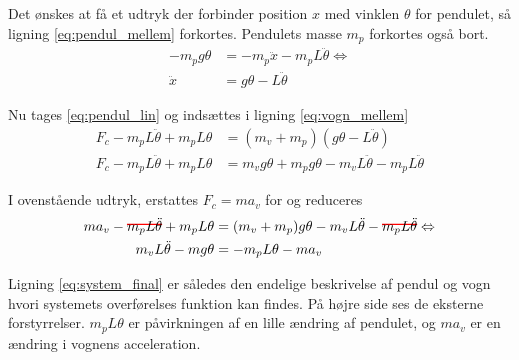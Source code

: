 Det ønskes at få et udtryk der forbinder position $x$ med vinklen $\theta$ for pendulet, så ligning \ref{eq:pendul_mellem} forkortes. Pendulets masse $m_p$ forkortes også bort. 
\begin{align}
-m_pg\theta &= -m_p\ddot{x}-m_p L \ddot{\theta} \Leftrightarrow\\
\ddot{x} &= g \theta -L \ddot{\theta} \label{eq:pendul_lin}
\end{align}

Nu tages \ref{eq:pendul_lin} og indsættes i ligning \ref{eq:vogn_mellem}
\begin{align}
F_c - m_p L\ddot{\theta} + m_p L\theta &= (m_v + m_p)(g \theta -L \ddot{\theta})  \\
F_c  - m_p L\ddot{\theta} + m_p L\theta &= m_v g \theta +  m_p g \theta - m_v L \ddot{\theta} - m_p L \ddot{\theta}
\end{align}

I ovenstående udtryk, erstattes $F_c = ma_v$ for og reduceres
\begin{align}
m a_v - \hcancel[red]{ m_p L\ddot{\theta}} + m_p L\theta &= (m_v + m_p) g \theta - m_v L \ddot{\theta} - \hcancel[red]{ m_p L\ddot{\theta}} \Leftrightarrow \\
m_v L \ddot{\theta} - m g \theta &= - m_p L\theta -m a_v \label{eq:system_final}
\end{align} 

Ligning \ref{eq:system_final} er således den endelige beskrivelse af pendul og vogn hvori systemets overførelses funktion kan findes.
På højre side ses de eksterne forstyrrelser. 
$m_pL\theta $ er påvirkningen af en lille ændring af pendulet, og $m a_v$ er en ændring i vognens acceleration.